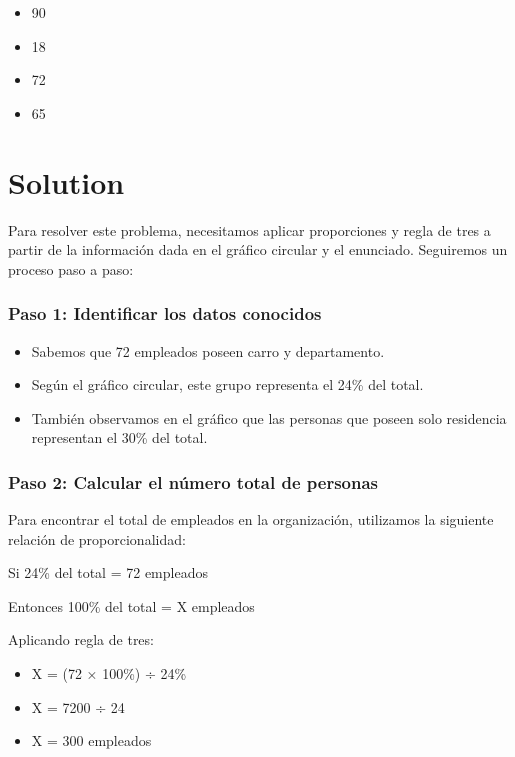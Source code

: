 \documentclass[
]{article}
\providecommand{\tightlist}{%
  \setlength{\itemsep}{0pt}\setlength{\parskip}{0pt}}
\begin{document}
\begin{itemize}
\tightlist
\item
  90
\item
  18
\item
  72
\item
  65
\end{itemize}

\section{Solution}\label{solution}

Para resolver este problema, necesitamos aplicar proporciones y regla de
tres a partir de la información dada en el gráfico circular y el
enunciado. Seguiremos un proceso paso a paso:

\subsubsection{Paso 1: Identificar los datos
conocidos}\label{paso-1-identificar-los-datos-conocidos}

\begin{itemize}
\tightlist
\item
  Sabemos que 72 empleados poseen carro y departamento.
\item
  Según el gráfico circular, este grupo representa el 24\% del total.
\item
  También observamos en el gráfico que las personas que poseen solo
  residencia representan el 30\% del total.
\end{itemize}

\subsubsection{Paso 2: Calcular el número total de
personas}\label{paso-2-calcular-el-nuxfamero-total-de-personas}

Para encontrar el total de empleados en la organización, utilizamos la
siguiente relación de proporcionalidad:

Si 24\% del total = 72 empleados

Entonces 100\% del total = X empleados

Aplicando regla de tres:

\begin{itemize}
\tightlist
\item
  X = (72 × 100\%) ÷ 24\%
\item
  X = 7200 ÷ 24
\item
  X = 300 empleados
\end{itemize}
\end{document}
